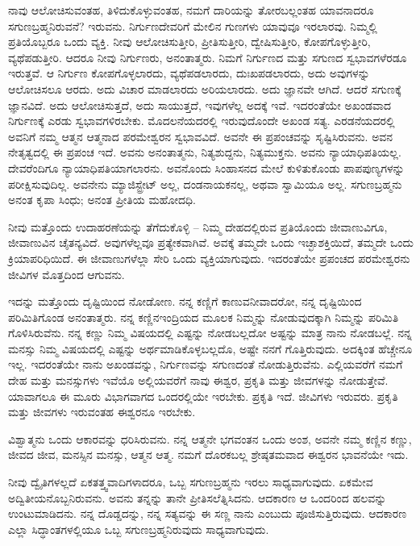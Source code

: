 ನಾವು ಆಲೋಚಿಸುವಂತಹ, ತಿಳಿದುಕೊಳ್ಳುವಂತಹ, ನಮಗೆ ದಾರಿಯನ್ನು ತೋರಬಲ್ಲಂತಹ ಯಾವನಾದರೂ ಸಗುಣಬ್ರಹ್ಮನಿರುವನೆ? ಇರುವನು. ನಿರ್ಗುಣದೇವರಿಗೆ ಮೇಲಿನ ಗುಣಗಳು ಯಾವುವೂ ಇರಲಾರವು. ನಿಮ್ಮಲ್ಲಿ ಪ್ರತಿಯೊಬ್ಬರೂ ಒಂದು ವ್ಯಕ್ತಿ. ನೀವು ಆಲೋಚಿಸುತ್ತೀರಿ, ಪ್ರೀತಿಸುತ್ತೀರಿ, ದ್ವೇಷಿಸುತ್ತೀರಿ, ಕೋಪಗೊಳ್ಳುತ್ತೀರಿ, ವ್ಯಥೆಪಡುತ್ತೀರಿ. ಆದರೂ ನೀವು ನಿರ್ಗುಣರು, ಅನಂತಾತ್ಮರು. ನಿಮಗೆ ನಿರ್ಗುಣದ ಮತ್ತು ಸಗುಣದ ಸ್ವಭಾವಗಳೆರಡೂ ಇರುತ್ತವೆ. ಆ ನಿರ್ಗುಣ ಕೋಪಗೊಳ್ಳಲಾರದು, ವ್ಯಥೆಪಡಲಾರದು, ದುಃಖಪಡಲಾರದು, ಅದು ಅವುಗಳನ್ನು ಆಲೋಚಿಸಲೂ ಆರದು. ಅದು ವಿಚಾರ ಮಾಡಲಾರದು ಅರಿಯಲಾರದು. ಅದು ಜ್ಞಾನವೇ ಆಗಿದೆ. ಆದರೆ ಸಗುಣಕ್ಕೆ ಜ್ಞಾನವಿದೆ. ಅದು ಆಲೋಚಿಸುತ್ತದೆ, ಅದು ಸಾಯುತ್ತದೆ, ಇವುಗಳೆಲ್ಲ ಅದಕ್ಕೆ ಇವೆ. ಇದರಂತೆಯೇ ಅಖಂಡವಾದ ನಿರ್ಗುಣಕ್ಕೆ ಎರಡು ಸ್ವಭಾವಗಳಿರಬೇಕು. ಮೊದಲನೆಯದರಲ್ಲಿ ಇರುವುದೊಂದೇ ಅಖಂಡ ಸತ್ಯ. ಎರಡನೆಯದರಲ್ಲಿ ಅವನಿಗೆ ನಮ್ಮ ಆತ್ಮನ ಆತ್ಮನಾದ ಪರಮೇಶ್ವರನ ಸ್ವಭಾವವಿದೆ. ಅವನೇ ಈ ಪ್ರಪಂಚವನ್ನು ಸೃಷ್ಟಿಸಿರುವನು. ಅವನ ನೇತೃತ್ವದಲ್ಲಿ ಈ ಪ್ರಪಂಚ ಇದೆ. ಅವನು ಅನಂತಾತ್ಮನು, ನಿತ್ಯಶುದ್ದನು, ನಿತ್ಯಮುಕ್ತನು. ಅವನು ನ್ಯಾಯಾಧಿಪತಿಯಲ್ಲ. ದೇವರೆಂದಿಗೂ ನ್ಯಾಯಾಧಿಪತಿಯಾಗಲಾರನು. ಅವನೊಂದು ಸಿಂಹಾಸನದ ಮೇಲೆ ಕುಳಿತುಕೊಂಡು ಪಾಪಪುಣ್ಯಗಳನ್ನು ಪರೀಕ್ಷಿಸುವುದಿಲ್ಲ. ಅವನೇನು ಮ್ಯಾಜಿಸ್ಟ್ರೇಟ್ ಅಲ್ಲ, ದಂಡನಾಯಕನಲ್ಲ, ಅಥವಾ ಸ್ವಾಮಿಯೂ ಅಲ್ಲ. ಸಗುಣಬ್ರಹ್ಮನು ಅನಂತ ಕೃಪಾ ಸಿಂಧು; ಅನಂತ ಪ್ರೀತಿಯ ಮಹೋದಧಿ.

ನೀವು ಮತ್ತೊಂದು ಉದಾಹರಣೆಯನ್ನು ತೆಗೆದುಕೊಳ್ಳಿ – ನಿಮ್ಮ ದೇಹದಲ್ಲಿರುವ ಪ್ರತಿಯೊಂದು ಜೀವಾಣುವಿಗೂ, ಜೀವಾಣುವಿನ ಚೈತನ್ಯವಿದೆ. ಅವುಗಳೆಲ್ಲವೂ ಪ್ರತ್ಯೇಕವಾಗಿವೆ. ಅವಕ್ಕೆ ತಮ್ಮದೇ ಒಂದು ಇಚ್ಛಾಶಕ್ತಿಯಿದೆ, ತಮ್ಮದೇ ಒಂದು ಕ್ರಿಯಾಪರಿಧಿಯಿದೆ. ಈ ಜೀವಾಣುಗಳೆಲ್ಲಾ ಸೇರಿ ಒಂದು ವ್ಯಕ್ತಿಯಾಗುವುದು. ಇದರಂತೆಯೇ ಪ್ರಪಂಚದ ಪರಮೇಶ್ವರನು ಜೀವಿಗಳ ಮೊತ್ತದಿಂದ ಆಗುವನು.

\newpage

ಇದನ್ನು ಮತ್ತೊಂದು ದೃಷ್ಟಿಯಿಂದ ನೋಡೋಣ. ನನ್ನ ಕಣ್ಣಿಗೆ ಕಾಣುವ\break ನೀವಾದರೋ, ನನ್ನ ದೃಷ್ಟಿಯಿಂದ ಪರಿಮಿತಿಗೊಂಡ ಅನಂತಾತ್ಮರು. ನನ್ನ ಕಣ್ಣಿನ\break ಇಂದ್ರಿಯದ ಮೂಲಕ ನಿಮ್ಮನ್ನು ನೋಡುವುದಕ್ಕಾಗಿ ನಿಮ್ಮನ್ನು ಪರಿಮಿತಿ ಗೊಳಿಸಿರುವೆನು. ನನ್ನ ಕಣ್ಣು ನಿಮ್ಮ ವಿಷಯದಲ್ಲಿ ಎಷ್ಟನ್ನು ನೋಡಬಲ್ಲದೋ ಅಷ್ಟನ್ನು ಮಾತ್ರ ನಾನು ನೋಡಬಲ್ಲೆ. ನನ್ನ ಮನಸ್ಸು ನಿಮ್ಮ ವಿಷಯದಲ್ಲಿ ಎಷ್ಟನ್ನು ಅರ್ಥಮಾಡಿಕೊಳ್ಳಬಲ್ಲದೊ, ಅಷ್ಟೇ ನನಗೆ ಗೊತ್ತಿರುವುದು. ಅದಕ್ಕಿಂತ ಹೆಚ್ಚೇನೂ ಇಲ್ಲ. ಇದರಂತೆಯೇ ನಾನು ಅಖಂಡವನ್ನು, ನಿರ್ಗುಣವನ್ನು ಸಗುಣದಂತೆ ನೋಡುತ್ತಿರುವೆನು. ಎಲ್ಲಿಯವರೆಗೆ ನಮಗೆ ದೇಹ ಮತ್ತು ಮನಸ್ಸುಗಳು ಇವೆಯೊ ಅಲ್ಲಿಯವರೆಗೆ ನಾವು ಈಶ್ವರ, ಪ್ರಕೃತಿ ಮತ್ತು ಜೀವಗಳನ್ನು ನೋಡುತ್ತೇವೆ. ಯಾವಾಗಲೂ ಈ ಮೂರು ವಿಭಾಗವಾಗದ ಒಂದರಲ್ಲಿಯೇ ಇರಬೇಕು. ಪ್ರಕೃತಿ ಇದೆ. ಜೀವಿಗಳು ಇರುವರು. ಪ್ರಕೃತಿ ಮತ್ತು ಜೀವಗಳು ಇರುವಂತಹ ಈಶ್ವರನೂ ಇರಬೇಕು.

\vskip 2pt

ವಿಶ್ವಾತ್ಮನು ಒಂದು ಆಕಾರವನ್ನು ಧರಿಸಿರುವನು. ನನ್ನ ಆತ್ಮನೇ ಭಗವಂತನ ಒಂದು ಅಂಶ, ಅವನೇ ನಮ್ಮ ಕಣ್ಣಿನ ಕಣ್ಣು, ಜೀವದ ಜೀವ, ಮನಸ್ಸಿನ ಮನಸ್ಸು, ಆತ್ಮನ ಆತ್ಮ. ನಮಗೆ ದೊರಕಬಲ್ಲ ಶ್ರೇಷ್ಠತಮವಾದ ಈಶ್ವರನ ಭಾವನೆಯೇ ಇದು.

\vskip 2pt

ನೀವು ದ್ವೈತಿಗಳಲ್ಲದೆ ಏಕತತ್ತ್ವವಾದಿಗಳಾದರೂ, ಒಬ್ಬ ಸಗುಣಬ್ರಹ್ಮನು ಇರಲು ಸಾಧ್ಯವಾಗುವುದು. ಏಕಮೇವ ಅದ್ವಿತೀಯನೊಬ್ಬನಿರುವನು. ಅವನು ತನ್ನನ್ನು ತಾನೇ ಪ್ರೀತಿಸಲೆತ್ನಿಸಿದನು. ಆದಕಾರಣ ಆ ಒಂದರಿಂದ ಹಲವನ್ನು ಉಂಟುಮಾಡಿದನು. ನನ್ನ ದೊಡ್ಡದನ್ನು, ನನ್ನ ಸತ್ಯವನ್ನು ಈ ಸಣ್ಣ ನಾನು ಎಂಬುದು ಪೂಜಿಸುತ್ತಿರುವುದು. ಆದಕಾರಣ ಎಲ್ಲಾ ಸಿದ್ಧಾಂತಗಳಲ್ಲಿಯೂ ಒಬ್ಬ ಸಗುಣಬ್ರಹ್ಮನಿರುವುದು ಸಾಧ್ಯವಾಗುವುದು.

